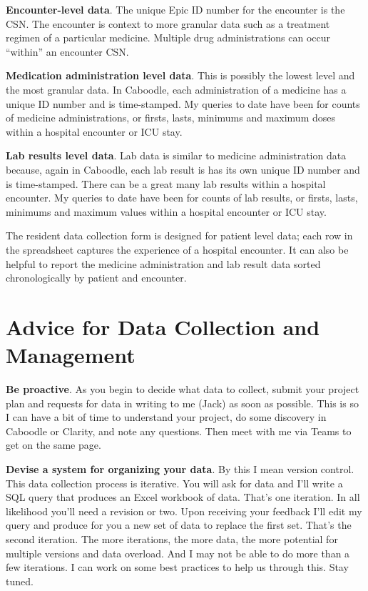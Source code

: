 \documentclass[
]{report}
\begin{document}
\textbf{Encounter-level data}. The unique Epic ID number for the
encounter is the CSN. The encounter is context to more granular data
such as a treatment regimen of a particular medicine. Multiple drug
administrations can occur ``within'' an encounter CSN.

\textbf{Medication administration level data}. This is possibly the
lowest level and the most granular data. In Caboodle, each
administration of a medicine has a unique ID number and is time-stamped.
My queries to date have been for counts of medicine administrations, or
firsts, lasts, minimums and maximum doses within a hospital encounter or
ICU stay.

\textbf{Lab results level data}. Lab data is similar to medicine
administration data because, again in Caboodle, each lab result is has
its own unique ID number and is time-stamped. There can be a great many
lab results within a hospital encounter. My queries to date have been
for counts of lab results, or firsts, lasts, minimums and maximum values
within a hospital encounter or ICU stay.

The resident data collection form is designed for patient level data;
each row in the spreadsheet captures the experience of a hospital
encounter. It can also be helpful to report the medicine administration
and lab result data sorted chronologically by patient and encounter.

\hypertarget{advice-for-data-collection-and-management}{%
\section{Advice for Data Collection and
Management}\label{advice-for-data-collection-and-management}}

\textbf{Be proactive}. As you begin to decide what data to collect,
submit your project plan and requests for data in writing to me (Jack)
as soon as possible. This is so I can have a bit of time to understand
your project, do some discovery in Caboodle or Clarity, and note any
questions. Then meet with me via Teams to get on the same page.

\textbf{Devise a system for organizing your data}. By this I mean
version control. This data collection process is iterative. You will ask
for data and I'll write a SQL query that produces an Excel workbook of
data. That's one iteration. In all likelihood you'll need a revision or
two. Upon receiving your feedback I'll edit my query and produce for you
a new set of data to replace the first set. That's the second iteration.
The more iterations, the more data, the more potential for multiple
versions and data overload. And I may not be able to do more than a few
iterations. I can work on some best practices to help us through this.
Stay tuned.
\end{document}
